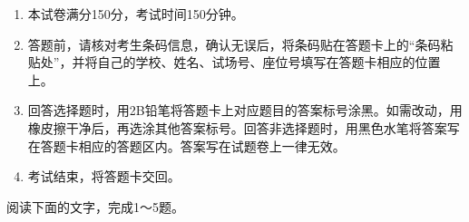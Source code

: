 \documentclass[11pt,a4paper]{ctexart}
\begin{document}

\begin{enumerate}[leftmargin=1.8em,itemsep=2pt,parsep=0pt]
\item 本试卷满分150分，考试时间150分钟。
\item 答题前，请核对考生条码信息，确认无误后，将条码贴在答题卡上的“条码粘贴处”，并将自己的学校、姓名、试场号、座位号填写在答题卡相应的位置上。
\item 回答选择题时，用2B铅笔将答题卡上对应题目的答案标号涂黑。如需改动，用橡皮擦干净后，再选涂其他答案标号。回答非选择题时，用黑色水笔将答案写在答题卡相应的答题区内。答案写在试题卷上一律无效。
\item 考试结束，将答题卡交回。
\end{enumerate}


阅读下面的文字，完成1～5题。
\end{document}
